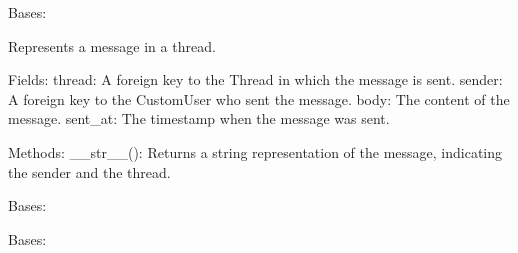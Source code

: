 \documentclass[letterpaper,10pt,english]{sphinxmanual}
\begin{document}
\begin{fulllineitems}
\label{\detokenize{modules/models:interactions.models.Message}}
\pysigstartsignatures
{}
\pysigstopsignatures
\sphinxAtStartPar
Bases: 

\sphinxAtStartPar
Represents a message in a thread.

\sphinxAtStartPar
Fields:
\sphinxhyphen{} thread: A foreign key to the Thread in which the message is sent.
\sphinxhyphen{} sender: A foreign key to the CustomUser who sent the message.
\sphinxhyphen{} body: The content of the message.
\sphinxhyphen{} sent\_at: The timestamp when the message was sent.

\sphinxAtStartPar
Methods:
\sphinxhyphen{} \_\_str\_\_(): Returns a string representation of the message, indicating the sender and the thread.

\begin{fulllineitems}
\label{\detokenize{modules/models:interactions.models.Message.DoesNotExist}}
\pysigstartsignatures
{}
\pysigstopsignatures
\sphinxAtStartPar
Bases: 

\end{fulllineitems}


\begin{fulllineitems}
\label{\detokenize{modules/models:interactions.models.Message.MultipleObjectsReturned}}
\pysigstartsignatures
{}
\pysigstopsignatures
\sphinxAtStartPar
Bases: 

\end{fulllineitems}


\end{fulllineitems}

\end{document}

